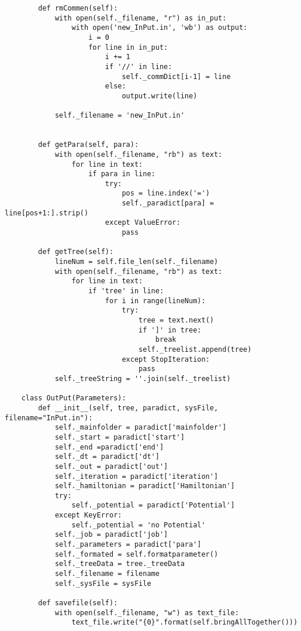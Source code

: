 \begin{verbatim}
        def rmCommen(self):
            with open(self._filename, "r") as in_put:
                with open('new_InPut.in', 'wb') as output:
                    i = 0
                    for line in in_put:
                        i += 1
                        if '//' in line:
                            self._commDict[i-1] = line
                        else:
                            output.write(line)
    
            self._filename = 'new_InPut.in'              
    
    
        def getPara(self, para):
            with open(self._filename, "rb") as text:
                for line in text:
                    if para in line:
                        try:
                            pos = line.index('=')     
                            self._paradict[para] = line[pos+1:].strip()  
                        except ValueError:
                            pass
    
        def getTree(self):                
            lineNum = self.file_len(self._filename)
            with open(self._filename, "rb") as text:
                for line in text:
                    if 'tree' in line:
                        for i in range(lineNum):
                            try:
                                tree = text.next()
                                if ']' in tree:
                                    break
                                self._treelist.append(tree)
                            except StopIteration:
                                pass
            self._treeString = ''.join(self._treelist)
    
    class OutPut(Parameters):
        def __init__(self, tree, paradict, sysFile, filename="InPut.in"):
            self._mainfolder = paradict['mainfolder']
            self._start = paradict['start']
            self._end =paradict['end']
            self._dt = paradict['dt']
            self._out = paradict['out']
            self._iteration = paradict['iteration']
            self._hamiltonian = paradict['Hamiltonian']
            try:
                self._potential = paradict['Potential']
            except KeyError:
                self._potential = 'no Potential'
            self._job = paradict['job']
            self._parameters = paradict['para']
            self._formated = self.formatparameter()
            self._treeData = tree._treeData
            self._filename = filename
            self._sysFile = sysFile
    
        def savefile(self):
            with open(self._filename, "w") as text_file:
                text_file.write("{0}".format(self.bringAllTogether()))
    

\end{verbatim}
